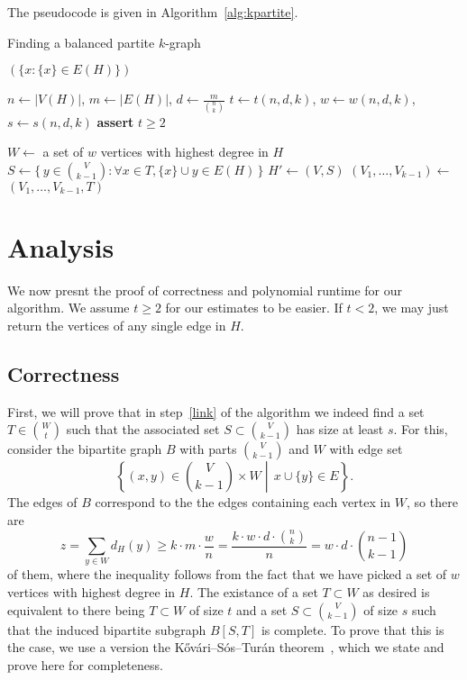 \documentclass[11pt,a4paper]{article}
\theoremstyle{definition}
\begin{document}
The pseudocode is given in Algorithm~\ref{alg:kpartite}.

\begin{algorithm}[H]
    \caption{Finding a balanced partite $k$-graph}
    \label{alg:kpartite}
    \begin{algorithmic}[1]
                \State \Return $(\{x \colon \{x\} \in E(H)\})$
            \EndIf

            \State $n \gets |V(H)|$, $m \gets |E(H)|$, $d \gets \frac{m}{\binom{n}{k}}$
            \State $t \gets t(n, d, k)$, $w \gets w(n, d, k)$, $s \gets s(n, d, k)$
            \State \textbf{assert} $t \ge 2$

            \State $W \gets$ a set of $w$ vertices with highest degree in $H$
                \State $S \gets \{\,y \in \binom{V}{k-1} \colon \forall x \in T, \{x\} \cup y \in E(H)\,\}$
                    \State $H' \gets (V, S)$  
                    \State $(V_1, \dots, V_{k-1}) \gets$ 
                    \State \Return $(V_1, \dots, V_{k-1}, T)$
                \EndIf
            \EndFor
        \EndFunction
    \end{algorithmic}
\end{algorithm}

\section{Analysis}\label{sec:analysis}

We now presnt the proof of correctness and polynomial runtime for our algorithm.
We assume $t \ge 2$ for our estimates to be easier.
If $t < 2$, we may just return the vertices of any single edge in $H$.

\subsection{Correctness}\label{subsec:correctness}

First, we will prove that in step~\ref{link} of the algorithm
we indeed find a set $T \in \binom{W}{t}$ such that the associated set $S \subset \binom{V}{k-1}$ has size at least $s$.
For this, consider the bipartite graph $B$ with parts $\binom{V}{k-1}$ and $W$ with edge set
\[
  \left\{(x, y) \in \binom{V}{k-1} \times W \middle| \, x \cup \{y\} \in E \right\}.
\]
The edges of $B$ correspond to the the edges containing each vertex in $W$, so there are
\[
    z = \sum_{y \in W} d_H(y) \geq k \cdot m \cdot \frac{w}{n} = \frac{k \cdot w \cdot d \cdot \binom{n}{k}}{n} = w \cdot d \cdot \binom{n - 1}{k-1}
\]
of them, where the inequality follows from the fact that we have picked a set of $w$ vertices with highest degree in $H$.
The existance of a set $T \subset W$ as desired is equivalent to there being $T \subset W$ of size $t$ and a set $S \subset \binom{V}{k-1}$ of size $s$
such that the induced bipartite subgraph $B[S, T]$ is complete.
To prove that this is the case,
we use a version the Kővári–Sós–Turán theorem~\cite{Kovari1954},
which we state and prove here for completeness.
\end{document}
